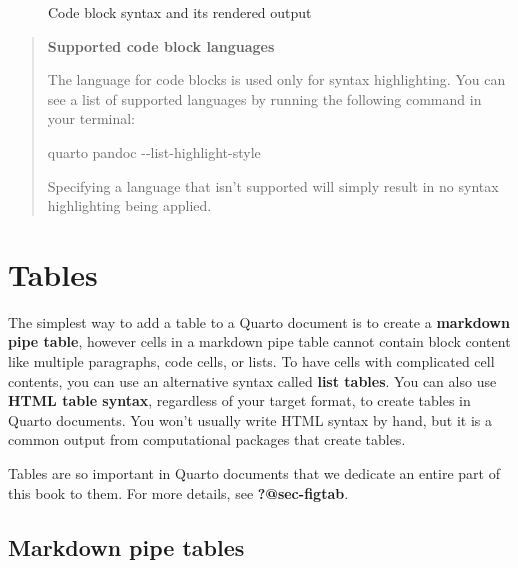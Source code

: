 \documentclass[
  letterpaper,
  DIV=11,
  numbers=noendperiod,
  oneside]{scrreprt}
\newenvironment{Shaded}{\begin{snugshade}}{\end{snugshade}}
\newcommand{\AttributeTok}[1]{\textcolor[rgb]{0.40,0.45,0.13}{#1}}
\newcommand{\ExtensionTok}[1]{\textcolor[rgb]{0.00,0.23,0.31}{#1}}
\newcommand{\NormalTok}[1]{\textcolor[rgb]{0.00,0.23,0.31}{#1}}
\begin{document}
\begin{tcolorbox}
\begin{figure}[H]
{\begin{codelisting}[H]
\end{codelisting}

}

\caption{\label{fig-code-block-with-filename}Code block syntax and its
rendered output}

\end{figure}%

\begin{quote}
\textbf{Supported code block languages}

The language for code blocks is used only for syntax highlighting. You
can see a list of supported languages by running the following command
in your terminal:

\begin{codelisting}[H]

\caption{\texttt{Terminal}}

\begin{Shaded}
\begin{Highlighting}[]
\ExtensionTok{quarto}\NormalTok{ pandoc }\AttributeTok{{-}{-}list{-}highlight{-}style} 
\end{Highlighting}
\end{Shaded}

\end{codelisting}

Specifying a language that isn't supported will simply result in no
syntax highlighting being applied.
\end{quote}

\section{Tables}\label{sec-markdown-tables}

The simplest way to add a table to a Quarto document is to create a
\textbf{markdown pipe table}, however cells in a markdown pipe table
cannot contain block content like multiple paragraphs, code cells, or
lists. To have cells with complicated cell contents, you can use an
alternative syntax called \textbf{list tables}. You can also use
\textbf{HTML table syntax}, regardless of your target format, to create
tables in Quarto documents. You won't usually write HTML syntax by hand,
but it is a common output from computational packages that create
tables.

Tables are so important in Quarto documents that we dedicate an entire
part of this book to them. For more details, see \textbf{?@sec-figtab}.

\subsection{Markdown pipe tables}\label{markdown-pipe-tables}


\end{tcolorbox}
\end{document}
